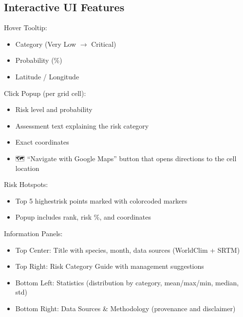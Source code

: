 \documentclass[letterpaper,10pt,english]{sphinxmanual}
\begin{document}
\subsection{Interactive UI Features}
\label{\detokenize{user_guide:interactive-ui-features}}
\sphinxAtStartPar
Hover Tooltip:
\begin{itemize}
\item {} 
\sphinxAtStartPar
Category (Very Low \(\rightarrow\) Critical)

\item {} 
\sphinxAtStartPar
Probability (\%)

\item {} 
\sphinxAtStartPar
Latitude / Longitude

\end{itemize}

\sphinxAtStartPar
Click Popup (per grid cell):
\begin{itemize}
\item {} 
\sphinxAtStartPar
Risk level and probability

\item {} 
\sphinxAtStartPar
Assessment text explaining the risk category

\item {} 
\sphinxAtStartPar
Exact coordinates

\item {} 
\sphinxAtStartPar
🗺️ “Navigate with Google Maps” button that opens directions to the cell location

\end{itemize}

\sphinxAtStartPar
Risk Hotspots:
\begin{itemize}
\item {} 
\sphinxAtStartPar
Top 5 highest\sphinxhyphen{}risk points marked with color\sphinxhyphen{}coded markers

\item {} 
\sphinxAtStartPar
Popup includes rank, risk \%, and coordinates

\end{itemize}

\sphinxAtStartPar
Information Panels:
\begin{itemize}
\item {} 
\sphinxAtStartPar
Top Center: Title with species, month, data sources (WorldClim + SRTM)

\item {} 
\sphinxAtStartPar
Top Right: Risk Category Guide with management suggestions

\item {} 
\sphinxAtStartPar
Bottom Left: Statistics (distribution by category, mean/max/min, median, std)

\item {} 
\sphinxAtStartPar
Bottom Right: Data Sources \& Methodology (provenance and disclaimer)

\end{itemize}
\end{document}

